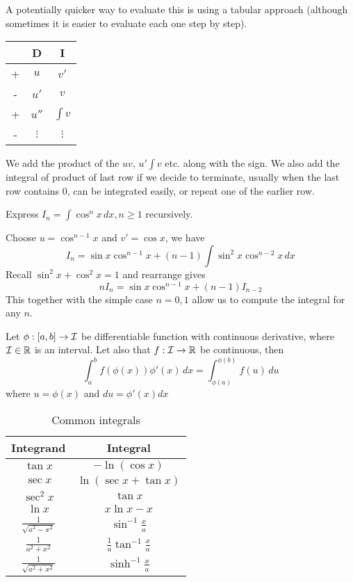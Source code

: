 \documentclass[11pt]{article}
\begin{document}
A potentially quicker way to evaluate this is using a tabular approach (although sometimes it is easier to evaluate each one step by step).
\begin{table}[ht]
  \begin{tabular}{c|c|c}
    & D & I\\
    \hline
    + & \(u\) & \(v'\)\\
    \hline
    - & \(u'\) & \(v\)\\
    \hline
    + & \(u''\) & \(\int v\)\\
    \hline
    - & \(\vdots\) & \(\vdots\)
  \end{tabular}
\end{table}
We add the product of the \(uv\), \(u'\int v\) etc. along with the sign. We also add the integral of product of last row if we decide to terminate, usually when the last row contains 0, can be integrated easily, or repeat one of the earlier row. 

\begin{exercise}
  Express \(I_n=\int \cos^n x\,dx, n\geq 1\) recursively.
\end{exercise}
\begin{solution}
  Choose \(u=\cos^{n-1}x\) and \(v'=\cos x\), we have 
  \[I_n = \sin x\cos^{n-1}x + (n-1)\int \sin^2x\cos^{n-2}x\,dx\]
  Recall \(\sin^2x+\cos^2x =1\) and rearrange gives
  \[nI_n=\sin x\cos^{n-1}x+(n-1)I_{n-2}\]
  This together with the simple case \(n=0,1\) allow us to compute the integral for any \(n\).
\end{solution}

\begin{theorem}
  Let \(\phi:[a,b]\to\cal{I}\) be differentiable function with continuous derivative, where \(\cal{I}\in\R\) is an interval. Let also that \(f:\cal{I}\to\R\) be continuous, then 
  \[\int_a^bf(\phi(x))\phi'(x)\,dx=\int_{\phi(a)}^{\phi(b)}f(u)\,du\]
  where \(u=\phi(x)\) and \(du=\phi'(x)dx\)
\end{theorem}

\begin{table}[ht]
  \begin{tabular}{c c}
    Integrand & Integral\\
    \hline\hline
    \(\tan x\) & \(-\ln(\cos x)\)\\
    \(\sec x\) & \(\ln(\sec x+\tan x)\)\\
    \(\sec^2x\)& \(\tan x\)\\
    \(\ln x\)& \(x\ln x-x\)\\ [3pt]
    \(\frac{1}{\sqrt{a^2-x^2}}\) & \(\sin^{-1} \frac{x}{a}\)\\[3pt]
    \(\frac{1}{a^2+x^2}\)& \(\frac{1}{a}\tan^{-1}\frac{x}{a}\)\\ [3pt]
    \(\frac{1}{\sqrt{a^2+x^2}}\) & \(\sinh^{-1} \frac{x}{a}\)\\
  \end{tabular}
  \caption{Common integrals}
\end{table}
\begin{exercise}
\end{exercise}
\end{document}
